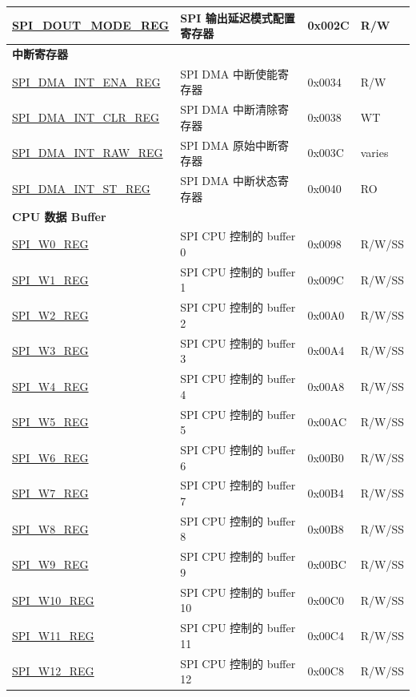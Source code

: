 \begin{longtable}{ | p{6cm} | p{6.2cm} | p{1.3cm} | p{2cm} | }
\hyperref[regdesc:SPIDOUTMODEREG]{SPI\_DOUT\_MODE\_REG} & SPI 输出延迟模式配置寄存器 & 0x002C & R/W \\ \hline
\multicolumn{4}{|l|}{\textbf{中断寄存器}} \\ \hline
\hyperref[regdesc:SPIDMAINTENAREG]{SPI\_DMA\_INT\_ENA\_REG} & SPI DMA 中断使能寄存器 & 0x0034 & R/W \\ \hline
\hyperref[regdesc:SPIDMAINTCLRREG]{SPI\_DMA\_INT\_CLR\_REG} & SPI DMA 中断清除寄存器 & 0x0038 & WT \\ \hline
\hyperref[regdesc:SPIDMAINTRAWREG]{SPI\_DMA\_INT\_RAW\_REG} & SPI DMA 原始中断寄存器 & 0x003C & varies \\ \hline
\hyperref[regdesc:SPIDMAINTSTREG]{SPI\_DMA\_INT\_ST\_REG} & SPI DMA 中断状态寄存器 & 0x0040 & RO \\ \hline
\multicolumn{4}{|l|}{\textbf{CPU 数据 Buffer}} \\ \hline
\hyperref[regdesc:SPIW0REG]{SPI\_W0\_REG} & SPI CPU 控制的 buffer 0 & 0x0098 & R/W/SS \\ \hline
\hyperref[regdesc:SPIW1REG]{SPI\_W1\_REG} & SPI CPU 控制的 buffer 1 & 0x009C & R/W/SS \\ \hline
\hyperref[regdesc:SPIW2REG]{SPI\_W2\_REG} & SPI CPU 控制的 buffer 2 & 0x00A0 & R/W/SS \\ \hline
\hyperref[regdesc:SPIW3REG]{SPI\_W3\_REG} & SPI CPU 控制的 buffer 3 & 0x00A4 & R/W/SS \\ \hline
\hyperref[regdesc:SPIW4REG]{SPI\_W4\_REG} & SPI CPU 控制的 buffer 4 & 0x00A8 & R/W/SS \\ \hline
\hyperref[regdesc:SPIW5REG]{SPI\_W5\_REG} & SPI CPU 控制的 buffer 5 & 0x00AC & R/W/SS \\ \hline
\hyperref[regdesc:SPIW6REG]{SPI\_W6\_REG} & SPI CPU 控制的 buffer 6 & 0x00B0 & R/W/SS \\ \hline
\hyperref[regdesc:SPIW7REG]{SPI\_W7\_REG} & SPI CPU 控制的 buffer 7 & 0x00B4 & R/W/SS \\ \hline
\hyperref[regdesc:SPIW8REG]{SPI\_W8\_REG} & SPI CPU 控制的 buffer 8 & 0x00B8 & R/W/SS \\ \hline
\hyperref[regdesc:SPIW9REG]{SPI\_W9\_REG} & SPI CPU 控制的 buffer 9 & 0x00BC & R/W/SS \\ \hline
\hyperref[regdesc:SPIW10REG]{SPI\_W10\_REG} & SPI CPU 控制的 buffer 10 & 0x00C0 & R/W/SS \\ \hline
\hyperref[regdesc:SPIW11REG]{SPI\_W11\_REG} & SPI CPU 控制的 buffer 11 & 0x00C4 & R/W/SS \\ \hline
\hyperref[regdesc:SPIW12REG]{SPI\_W12\_REG} & SPI CPU 控制的 buffer 12 & 0x00C8 & R/W/SS \\ \hline

\end{longtable}
